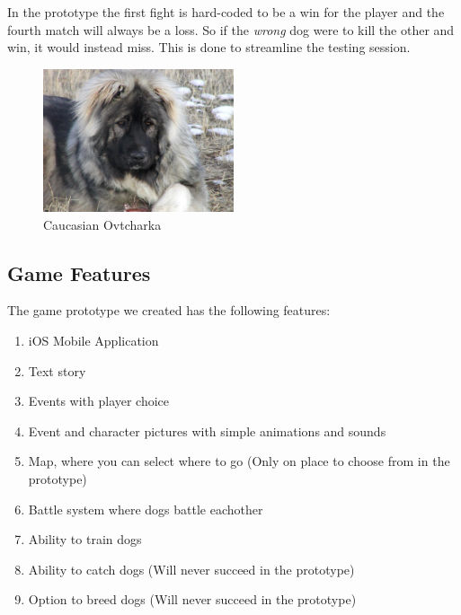 In the prototype the first fight is hard-coded to be a win for the player and the fourth match will always be a loss. So if the \textit{wrong} dog were to kill the other and win, it would instead miss. This is done to streamline the testing session.\

\begin{figure}
	\centering
    \includegraphics[width=0.5\textwidth]{ovtcharka.jpg}
    \caption{Caucasian Ovtcharka}
    \label{fig:ovtcharka}
\end{figure}

\subsection{Game Features}
The game prototype we created has the following features:

\begin{enumerate}
	\item iOS Mobile Application
	\item Text story
	\item Events with player choice
	\item Event and character pictures with simple animations and sounds
	\item Map, where you can select where to go (Only on place to choose from in the prototype)
	\item Battle system where dogs battle eachother
	\item Ability to train dogs
	\item Ability to catch dogs (Will never succeed in the prototype)
	\item Option to breed dogs (Will never succeed in the prototype)
\end{enumerate}

